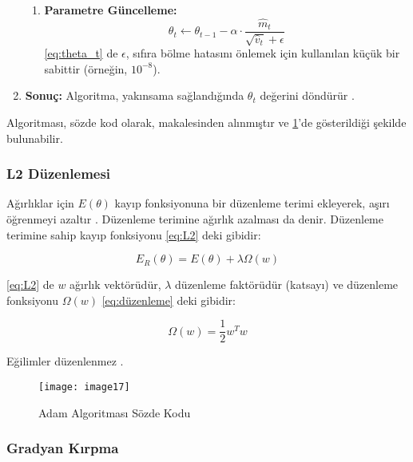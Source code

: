 \begin{enumerate}
\begin{enumerate}
        \item \textbf{Parametre Güncelleme:}
        \begin{equation}
        \theta_t \gets \theta_{t-1} - \alpha \cdot \frac{\hat{m}_t}{\sqrt{\hat{v}_t} + \epsilon}
        \label{eq:theta_t}
        \end{equation}
        \eqref{eq:theta_t} de $\epsilon$, sıfıra bölme hatasını önlemek için kullanılan küçük bir sabittir (örneğin, $10^{-8}$).
    \end{enumerate}
    
    \item \textbf{Sonuç:} Algoritma, yakınsama sağlandığında $\theta_t$ değerini döndürür \cite{kingma2017adammethodstochasticoptimization}.
\end{enumerate}


Algoritması, sözde kod olarak, \cite{kingma2017adammethodstochasticoptimization} makalesinden alınmıştır ve \ref{fig:adamalg}'de gösterildiği şekilde bulunabilir.

\subsubsection{L2 Düzenlemesi}

Ağırlıklar için $E(\theta)$ kayıp fonksiyonuna bir düzenleme terimi ekleyerek, aşırı öğrenmeyi azaltır \cite{PaterrecogBishop, machinelearning:2012}. Düzenleme terimine ağırlık azalması da denir. Düzenleme terimine sahip kayıp fonksiyonu \eqref{eq:L2} deki gibidir:

\begin{equation}
    E_R(\theta)=E(\theta)+\lambda \Omega(w)
    \label{eq:L2}
\end{equation}

\eqref{eq:L2} de $w$ ağırlık vektörüdür, $\lambda$ düzenleme faktörüdür (katsayı) ve düzenleme fonksiyonu $\Omega(w)$ \eqref{eq:düzenleme} deki gibidir:

\begin{equation}
    \Omega(w)=\frac{1}{2} w^T w
    \label{eq:düzenleme}
\end{equation}

Eğilimler düzenlenmez \cite{machinelearning:2012}.

\begin{figure}[H]
    \centering
    \texttt{[image: image17]}
    \caption{Adam Algoritması Sözde Kodu}
    \label{fig:adamalg}
\end{figure}

\subsubsection{Gradyan Kırpma}

